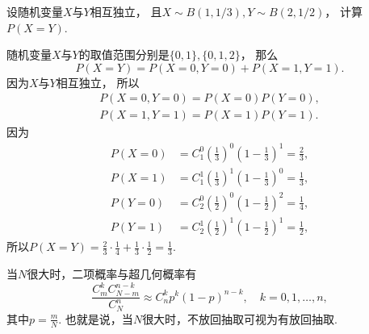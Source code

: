 \begin{example}
设随机变量\(X\)与\(Y\)相互独立，
且\(X \sim B(1,1/3),
Y \sim B(2,1/2)\)，
计算\(P(X=Y)\).
\begin{solution}
随机变量\(X\)与\(Y\)的取值范围分别是\(\{0,1\},\{0,1,2\}\)，
那么\begin{equation*}
	P(X=Y) = P(X=0,Y=0) + P(X=1,Y=1).
\end{equation*}
因为\(X\)与\(Y\)相互独立，
所以\begin{gather*}
	P(X=0,Y=0) = P(X=0) P(Y=0), \\
	P(X=1,Y=1) = P(X=1) P(Y=1).
\end{gather*}
因为\begin{align*}
	P(X=0) &= C_1^0 \left( \frac13 \right)^0 \left( 1-\frac13 \right)^1
	= \frac23, \\
	P(X=1) &= C_1^1 \left( \frac13 \right)^1 \left( 1-\frac13 \right)^0
	= \frac13, \\
	P(Y=0) &= C_2^0 \left( \frac12 \right)^0 \left( 1-\frac12 \right)^2
	= \frac14, \\
	P(Y=1) &= C_2^1 \left( \frac12 \right)^1 \left( 1-\frac12 \right)^1
	= \frac12,
\end{align*}
所以\(P(X=Y) = \frac23 \cdot \frac14 + \frac13 \cdot \frac12
= \frac13\).
\end{solution}
\end{example}

\begin{theorem}
当\(N\)很大时，二项概率与超几何概率有\begin{equation*}
	\frac{C_m^k C_{N-m}^{n-k}}{C_N^n}
	\approx
	C_n^k p^k (1-p)^{n-k}, \quad k=0,1,\dotsc,n,
\end{equation*}
其中\(p=\frac{m}{N}\).
也就是说，当\(N\)很大时，不放回抽取可视为有放回抽取.
\end{theorem}

